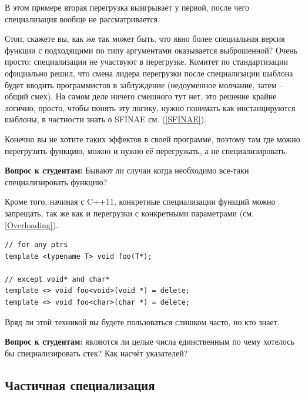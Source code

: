 \documentclass[a4paper,12pt,oneside]{book}
\newif\ifanswers
\begin{document}
В этом примере вторая перегрузка выигрывает у первой, после чего специализация вообще не рассматривается.

Стоп, скажете вы, как же так может быть, что явно более специальная версия функции с подходящими по типу аргументами оказывается выброшенной? Очень просто: специализации не участвуют в перегрузке. Комитет по стандартизации официально решил, что смена лидера перегрузки после специализации шаблона будет вводить программистов в заблуждение (недоуменное молчание, затем -- общий смех). На самом деле ничего смешного тут нет, это решение крайне логично, просто, чтобы понять эту логику, нужно понимать как инстанцируются шаблоны, в частности знать о SFINAE см. (\ref{SFINAE}).

Конечно вы не хотите таких эффектов в своей программе, поэтому там где можно перегрузить функцию, можно и нужно её перегружать, а не специализировать.

\textbf{Вопрос к студентам:} Бывают ли случаи когда необходимо все-таки специализировать функцию?

\ifanswers
Правильный ответ следует из предыдущего параграфа: это как раз те случаи, когда её \textbf{нельзя} перегрузить. Например стандарт регламентирует, что перегрузка функций из пространства имен \lstinline!std! запрещена, но часто хочется \lstinline!std::swap! для своих типов, в этом случае специализация -- единственный выход.
\fi

Кроме того, начиная с C++11, конкретные специализации функций можно запрещать, так же как и перегрузки с конкретными параметрами (см. \ref{Overloading}).

\begin{lstlisting}
// for any ptrs
template <typename T> void foo(T*); 

// except void* and char*
template <> void foo<void>(void *) = delete;
template <> void foo<char>(char *) = delete;
\end{lstlisting}

Вряд ли этой техникой вы будете пользоваться слишком часто, но кто знает.

\textbf{Вопрос к студентам:} являются ли целые числа единственным по чему хотелось бы специализировать стек? Как насчёт указателей?

\ifanswers
Вопрос, разумеется, риторический.
\fi

\subsection{Частичная специализация}\label{PartialSpec}
\end{document}
